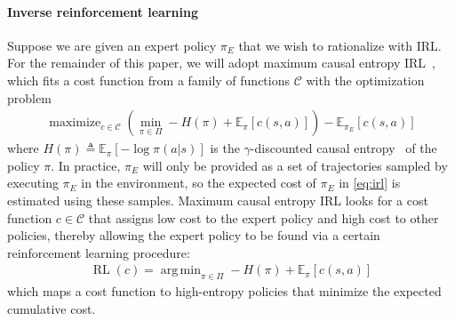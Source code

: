 \documentclass{article}
\newcommand\bbE{\ensuremath{\mathbb{E}}} %
\DeclareMathOperator*{\maximize}{maximize}
\DeclareMathOperator*{\argmin}{arg\,min}
\newcommand{\1}{\mathbb{I}} %
\DeclareMathOperator{\rl}{RL}
\begin{document}
\paragraph{Inverse reinforcement learning}
Suppose we are given an expert policy $\pi_E$ that we wish to rationalize with IRL. For the remainder of this paper, we will adopt maximum causal entropy IRL~\citep{ziebart2008maximum,ziebart2010modeling}, which fits a cost function from a family of functions $\mathcal{C}$ with the optimization problem
\begin{align}
\maximize_{c\in\mathcal{C}} \left(\min_{\pi\in\Pi} -H(\pi) + \bbE_{\pi} [c(s,a)]\right) - \bbE_{\pi_E} [c(s,a)] \label{eq:irl}
\end{align}
where $H(\pi) \triangleq \mathbb{E}_{\pi}[-\log \pi(a|s)]$ is the $\gamma$-discounted causal entropy~\citep{bloem2014infinite} of the policy $\pi$. In practice, $\pi_E$ will only be provided as a set of trajectories sampled by executing $\pi_E$ in the environment, so the expected cost of $\pi_E$ in \cref{eq:irl} is estimated using these samples. Maximum causal entropy IRL looks for a cost function $c\in\mathcal{C}$ that assigns low cost to the expert policy and high cost to other policies, thereby allowing the expert policy to be found via a certain reinforcement learning procedure:
\begin{align}
\rl(c) = \argmin_{\pi\in\Pi} -H(\pi) + \bbE_{\pi}[c(s,a)]
\end{align}
which maps a cost function to high-entropy policies that minimize the expected cumulative cost. 

\end{document}
